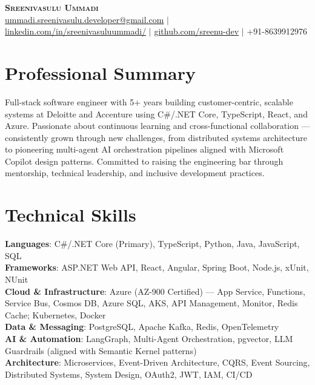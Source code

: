 \documentclass[letterpaper,11pt]{article}
\begin{document}
\begin{center}
    \textbf{\Huge \scshape Sreenivasulu Ummadi} \\ \vspace{5pt}
    \small \href{mailto:ummadi.sreenivasulu.developer@gmail.com}{ummadi.sreenivasulu.developer@gmail.com} $|$
    \href{https://www.linkedin.com/in/sreenivasuluummadi/}{linkedin.com/in/sreenivasuluummadi/} $|$
    \href{https://github.com/sreenu-dev}{github.com/sreenu-dev} $|$
    \small +91-8639912976
\end{center}

\section{Professional Summary}
\small{Full-stack software engineer with 5+ years building customer-centric, scalable systems at Deloitte and Accenture using C\#/.NET Core, TypeScript, React, and Azure. Passionate about continuous learning and cross-functional collaboration — consistently grown through new challenges, from distributed systems architecture to pioneering multi-agent AI orchestration pipelines aligned with Microsoft Copilot design patterns. Committed to raising the engineering bar through mentorship, technical leadership, and inclusive development practices.}

\section{Technical Skills}
 \begin{itemize}[leftmargin=0.15in, label={}]
    \small{\item{
     \textbf{Languages}{: C\#/.NET Core (Primary), TypeScript, Python, Java, JavaScript, SQL} \\
     \textbf{Frameworks}{: ASP.NET Web API, React, Angular, Spring Boot, Node.js, xUnit, NUnit} \\
     \textbf{Cloud \& Infrastructure}{: Azure (AZ-900 Certified) --- App Service, Functions, Service Bus, Cosmos DB, Azure SQL, AKS, API Management, Monitor, Redis Cache; Kubernetes, Docker} \\
     \textbf{Data \& Messaging}{: PostgreSQL, Apache Kafka, Redis, OpenTelemetry} \\
     \textbf{AI \& Automation}{: LangGraph, Multi-Agent Orchestration, pgvector, LLM Guardrails (aligned with Semantic Kernel patterns)} \\
     \textbf{Architecture}{: Microservices, Event-Driven Architecture, CQRS, Event Sourcing, Distributed Systems, System Design, OAuth2, JWT, IAM, CI/CD}
    }}
 \end{itemize}
\end{document}
